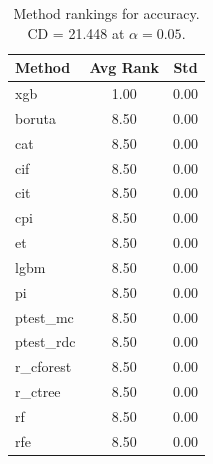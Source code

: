 \begin{table}[h]
\centering
\caption{Method rankings for accuracy. CD = 21.448 at $\alpha=0.05$.}
\label{tab:ranks_accuracy}
\begin{tabular}{lcc}
\toprule
Method & Avg Rank & Std \\
\midrule
xgb & 1.00 & 0.00 \\
boruta & 8.50 & 0.00 \\
cat & 8.50 & 0.00 \\
cif & 8.50 & 0.00 \\
cit & 8.50 & 0.00 \\
cpi & 8.50 & 0.00 \\
et & 8.50 & 0.00 \\
lgbm & 8.50 & 0.00 \\
pi & 8.50 & 0.00 \\
ptest_mc & 8.50 & 0.00 \\
ptest_rdc & 8.50 & 0.00 \\
r_cforest & 8.50 & 0.00 \\
r_ctree & 8.50 & 0.00 \\
rf & 8.50 & 0.00 \\
rfe & 8.50 & 0.00 \\
\bottomrule
\end{tabular}
\end{table}